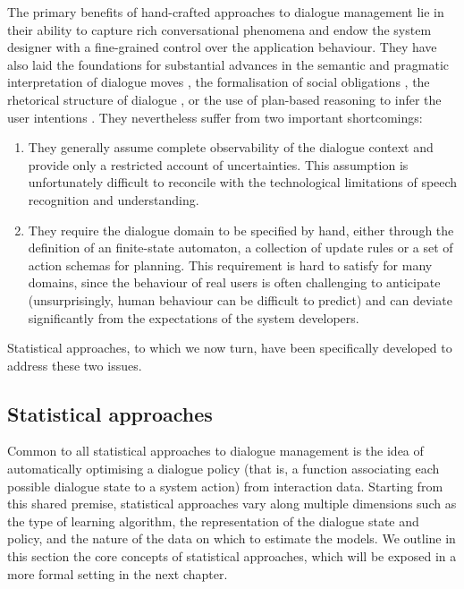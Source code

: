 The primary benefits of hand-crafted approaches to dialogue management lie in their ability to capture rich conversational phenomena and endow the system designer with a fine-grained control over the application behaviour.  They have also laid the foundations for substantial advances in the semantic and pragmatic interpretation of dialogue moves \citep{ThomasonManuscript-THOEUA,Ginzburg2012}, the formalisation of social obligations \citep{Traum:1994}, the rhetorical structure of dialogue \citep{0521659515}, or the use of plan-based reasoning to infer the user intentions \citep{Allen1980,Litman87}.  They nevertheless suffer from two important shortcomings: \begin{enumerate}
\item They generally assume complete observability of the dialogue context and provide only a restricted account of uncertainties. This assumption is unfortunately difficult to reconcile with the technological limitations of speech recognition and understanding.
\item They require the dialogue domain to be specified by hand, either through the definition of an finite-state automaton, a collection of update rules or a set of action schemas for planning.  This requirement is hard to satisfy for many domains, since the behaviour of real users is often challenging to anticipate (unsurprisingly, human behaviour can be difficult to predict) and can deviate significantly from the expectations of the system developers. 
\end{enumerate}

Statistical approaches, to which we now turn, have been specifically developed to address these two issues.

\subsection{Statistical approaches}
\label{sec:statistical}

Common to all statistical approaches to dialogue management is the idea of automatically optimising a dialogue policy (that is, a function associating each possible dialogue state to a system action) from interaction data.  Starting from this shared premise, statistical approaches vary along multiple dimensions such as the type of learning algorithm, the representation of the dialogue state and policy, and the nature of the data on which to estimate the models. We outline in this section the core concepts of statistical approaches, which will be exposed in a more formal setting in the next chapter. 


